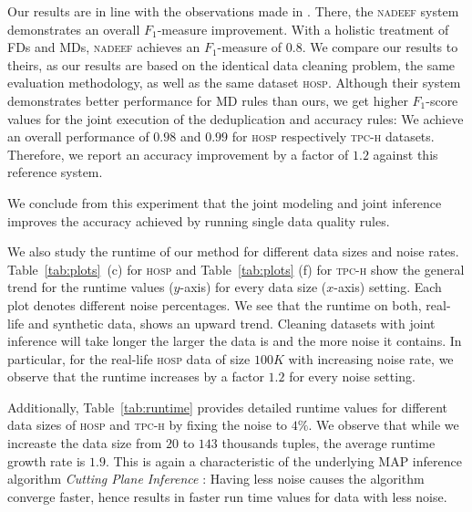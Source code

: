 Our results are in line with the observations made in \cite{Dallachiesa:2013:NCD:2463676.2465327}. There, the \textsc{nadeef} system demonstrates an overall $F_1$-measure improvement. With a holistic treatment of FDs and MDs, \textsc{nadeef} achieves an $F_1$-measure of $0.8$. We compare our results to theirs, as our results are based on the identical data cleaning problem, the same evaluation methodology, as well as the same dataset \textsc{hosp}. Although their system demonstrates better performance for MD rules than ours, we get higher $F_1$-score values for the joint execution of the deduplication and accuracy rules: We achieve an overall performance of $0.98$ and $0.99$ for \textsc{hosp} respectively \textsc{tpc-h} datasets. Therefore, we report an accuracy improvement by a factor of $1.2$ against this reference system.

We conclude from this experiment that the joint modeling and joint inference improves the accuracy achieved by running single data quality rules.

We also study the runtime of our method for different data sizes and noise rates. Table~\ref{tab:plots}~(c) for \textsc{hosp} and Table~\ref{tab:plots} (f) for \textsc{tpc-h} show the general trend for the runtime values ($y$-axis) for every data size ($x$-axis) setting. Each plot denotes different noise percentages. We see that the runtime on both, real-life and synthetic data, shows an upward trend. Cleaning datasets with joint inference will take longer the larger the data is and the more noise it contains. In particular, for the real-life \textsc{hosp} data of size $100K$ with increasing noise rate, we observe that the runtime increases by a factor $1.2$ for every noise setting. 

Additionally, Table~\ref{tab:runtime} provides detailed runtime values for different data sizes of \textsc{hosp} and \textsc{tpc-h} by fixing the noise to $4\%$. We observe that while we increaste the data size from $20$ to $143$ thousands tuples, the average runtime growth rate is $1.9$. This is again a characteristic of the underlying MAP inference algorithm \textit{Cutting Plane Inference} \cite{riedel08improving}: Having less noise causes the algorithm converge faster, hence results in faster run time values for data with less noise. 

